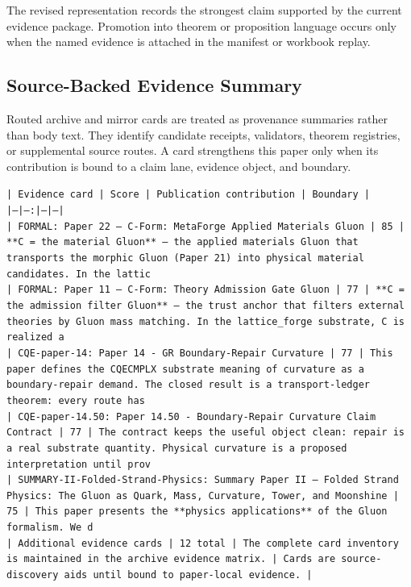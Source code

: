 \documentclass[11pt]{article}
\begin{document}
The revised representation records the strongest claim supported by the current evidence package. Promotion into theorem or proposition language occurs only when the named evidence is attached in the manifest or workbook replay.

\subsection*{Source-Backed Evidence Summary}

Routed archive and mirror cards are treated as provenance summaries rather than
body text. They identify candidate receipts, validators, theorem registries, or
supplemental source routes. A card strengthens this paper only when its
contribution is bound to a claim lane, evidence object, and boundary.

\noindent\texttt{| Evidence card | Score | Publication contribution | Boundary |}\\
\noindent\texttt{|---|---:|---|---|}\\
\noindent\texttt{| FORMAL: Paper 22 — C-Form: MetaForge Applied Materials Gluon | 85 | **C = the material Gluon** — the applied materials Gluon that transports the morphic Gluon (Paper 21) into physical material candidates. In the lattic}\\
\noindent\texttt{| FORMAL: Paper 11 — C-Form: Theory Admission Gate Gluon | 77 | **C = the admission filter Gluon** — the trust anchor that filters external theories by Gluon mass matching. In the lattice\_forge substrate, C is realized a}\\
\noindent\texttt{| CQE-paper-14: Paper 14 - GR Boundary-Repair Curvature | 77 | This paper defines the CQECMPLX substrate meaning of curvature as a boundary-repair demand. The closed result is a transport-ledger theorem: every route has }\\
\noindent\texttt{| CQE-paper-14.50: Paper 14.50 - Boundary-Repair Curvature Claim Contract | 77 | The contract keeps the useful object clean: repair is a real substrate quantity. Physical curvature is a proposed interpretation until prov}\\
\noindent\texttt{| SUMMARY-II-Folded-Strand-Physics: Summary Paper II — Folded Strand Physics: The Gluon as Quark, Mass, Curvature, Tower, and Moonshine | 75 | This paper presents the **physics applications** of the Gluon formalism. We d}\\
\noindent\texttt{| Additional evidence cards | 12 total | The complete card inventory is maintained in the archive evidence matrix. | Cards are source-discovery aids until bound to paper-local evidence. |}\\
\end{document}
